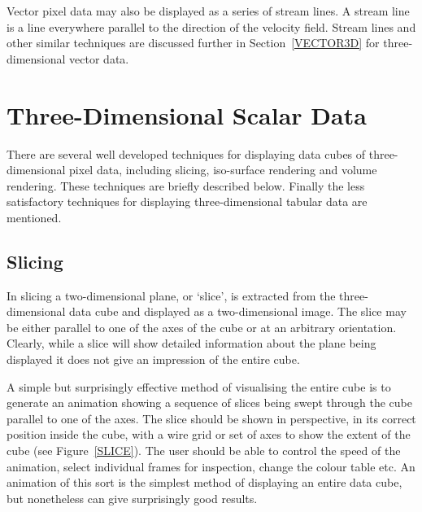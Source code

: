 Vector pixel data may also be displayed as a series of stream lines.
A stream line is a line everywhere parallel to the direction of the
velocity field. Stream lines and other similar techniques are discussed
further in Section~\ref{VECTOR3D} for three-dimensional vector data.


\section{Three-Dimensional Scalar Data
\label{SCALAR3D}  }

There are several well developed techniques for displaying data cubes
of three-dimensional pixel data, including slicing, iso-surface
rendering and volume rendering. These techniques are briefly described
below. Finally the less satisfactory techniques for displaying
three-dimensional tabular data are mentioned.

\subsection{Slicing}

In slicing a two-dimensional plane, or `slice', is extracted from the
three-dimensional data cube and displayed as a two-dimensional image.
The slice may be either parallel to one of the axes of the cube or at
an arbitrary orientation. Clearly, while a slice will show detailed
information about the plane being displayed it does not give an
impression of the entire cube.

A simple but surprisingly effective method of visualising the entire
cube is to generate an animation showing a sequence of slices being
swept through the cube parallel to one of the axes. The slice should be
shown in perspective, in its correct position inside the cube, with a 
wire grid or set of axes to show the extent of the cube (see
Figure~\ref{SLICE}). The user should be able to control the speed of the
animation, select individual frames for inspection, change the colour
table etc. An animation of this sort is the simplest method of displaying
an entire data cube, but nonetheless can give surprisingly good results.

